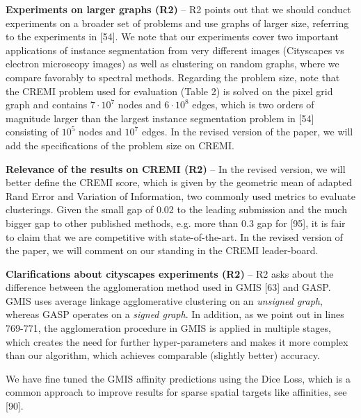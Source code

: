 \documentclass[10pt,twocolumn,letterpaper]{article}
\begin{document}
\textbf{Experiments on larger graphs (R2)} --
R2 points out that we should conduct experiments on a broader set of problems and use graphs of larger size, referring to the experiments in [54]. We note that our experiments cover two important applications of instance segmentation from very different images (Cityscapes vs electron microscopy images) as well as clustering on random graphs, where we compare favorably to spectral methods. Regarding the problem size, note that the CREMI problem used for evaluation (Table 2) is solved on the pixel grid graph and contains $7\cdot 10^7$ nodes and $6\cdot 10^8$ edges, which is two orders of magnitude larger than the largest instance segmentation problem in [54] consisting of $10^5$ nodes and $10^7$ edges. In the revised version of the paper, we will add the specifications of the problem size on CREMI.

\textbf{Relevance of the results on CREMI (R2)} --
In the revised version, we will better define the CREMI score, which is given by the geometric mean of adapted Rand Error and Variation of Information, two commonly used metrics to evaluate clusterings. Given the small gap of 0.02 to the leading submission and the much bigger gap to other published methods, e.g. more than 0.3 gap for [95], it is fair to claim that we are competitive with state-of-the-art. In the revised version of the paper, we will comment on our standing in the CREMI leader-board. 

\textbf{Clarifications about cityscapes experiments (R2)} --
R2 asks about the difference between the agglomeration method used in GMIS [63] and GASP. GMIS uses average linkage agglomerative clustering on an \emph{unsigned graph}, whereas GASP operates on a \emph{signed graph}. 
In addition, as we point out in lines 769-771, the agglomeration procedure in GMIS is applied in multiple stages, which creates the need for further hyper-parameters and makes it more complex than our algorithm, which achieves comparable (slightly better) accuracy. 

We have fine tuned the GMIS affinity predictions using the Dice Loss, which is a common approach to improve results for sparse spatial targets like affinities, see [90].


% 
% 
\end{document}
